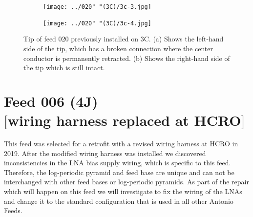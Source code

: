 \documentclass[12pt,a4paper,oneside]{article}
\begin{document}
\newpage
%
\begin{figure}[H]
   \thispagestyle{empty}
    \centering
        \begin{subfigure}[t]{0.92\textwidth}
        \centering
        \texttt{[image: ../020" "(3C)/3c-3.jpg]}
        \caption{}
        \label{fig:Tsys-1g}
   	 \end{subfigure}
   
   
        \begin{subfigure}[t]{0.92\textwidth}
        \centering
        \texttt{[image: ../020" "(3C)/3c-4.jpg]}
        \caption{}
        \label{fig:SpecX-1g}
   	 \end{subfigure}
    \caption{Tip of feed 020 previously installed on 3C. (a) Shows the left-hand side of the tip, which has a broken connection where the center conductor is permanently retracted. (b) Shows the right-hand side of the tip which is still intact. }
    \label{fig:inspect-020}
\end{figure}
%









\newpage
\section{Feed 006 (4J)\\ $[$wiring harness replaced at HCRO$]$}
\label{sec:3}

This feed was selected for a retrofit with a revised wiring harness at HCRO in 2019. After the modified wiring harness was installed we discovered inconsistencies
in the LNA bias supply wiring, which is specific to this feed. Therefore, the log-periodic pyramid and feed base are unique and can not be interchanged with other feed bases or log-periodic pyramids. As part of the repair which will happen on this feed we will investigate to fix the wiring of the LNAs and change it to the standard configuration that is used in all other Antonio Feeds.
\end{document}
